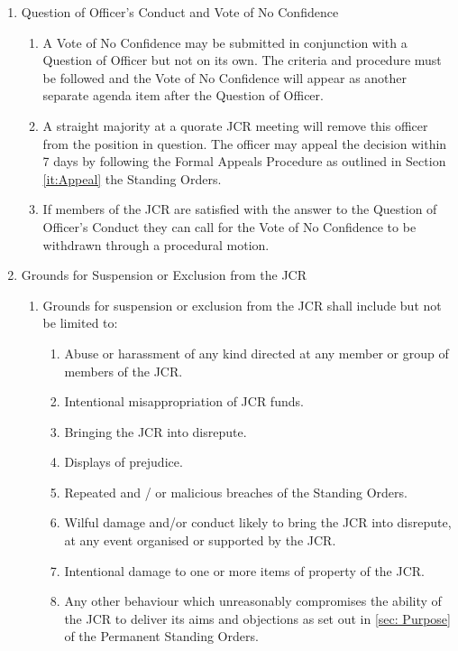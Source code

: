 \begin{enumerate}
\begin{enumerate}
    \end{enumerate}
    \item Question of Officer's Conduct and Vote of No Confidence
    \label{it: QOO VONC}
    \begin{enumerate}
        \item A Vote of No Confidence may be submitted in conjunction with a Question of Officer but not on its own. The criteria and procedure must be followed and the Vote of No Confidence will appear as another separate agenda item after the Question of Officer.
        \item A straight majority at a quorate JCR meeting will remove this officer from the position in question. The officer may appeal the decision within 7 days by following the Formal Appeals Procedure as outlined in Section \ref{it:Appeal} the Standing Orders.
        \item If members of the JCR are satisfied with the answer to the Question of Officer’s Conduct they can call for the Vote of No Confidence to be withdrawn through a procedural motion.
    \end{enumerate}
    \item Grounds for Suspension or Exclusion from the JCR
    \label{it: Grounds for Suspension or Exclusion}
    \begin{enumerate}
        \item Grounds for suspension or exclusion from the JCR shall include but not be limited to:
        \begin{enumerate}
            \item Abuse or harassment of any kind directed at any member or group of members of the JCR.
            \item Intentional misappropriation of JCR funds.
            \item Bringing the JCR into disrepute.
            \item Displays of prejudice.
            \item Repeated and / or malicious breaches of the Standing Orders.
            \item Wilful damage and/or conduct likely to bring the JCR into disrepute, at any event organised or supported by the JCR.
            \item Intentional damage to one or more items of property of the JCR.
            \item Any other behaviour which unreasonably compromises the ability of the JCR to deliver its
            aims and objections as set out in \ref{sec: Purpose} of the Permanent Standing Orders.

\end{enumerate}
\end{enumerate}
\end{enumerate}
